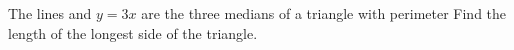 The lines   and $y=3x$ are the three medians of a triangle with perimeter   Find the length of the longest side of the triangle.